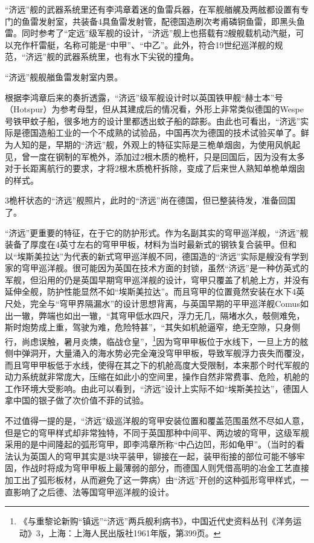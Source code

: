 \documentclass[12pt,UTF8]{ctexbook}
\begin{document}
“济远”舰的武器系统里还有李鸿章着迷的鱼雷兵器，在军舰艏艉及两舷都设置有专门的鱼雷发射室，共装备4具鱼雷发射管，配德国造刷次考甫磷铜鱼雷，即黑头鱼雷。同时参考了“定远”级军舰的设计，“济远”舰上也搭载有2艘舰载机动汽艇，可以充作杆雷艇，名称可能是“中甲”、“中乙”。此外，符合19世纪巡洋舰的规范，“济远”舰的武器系统里，也有水下尖锐的撞角。

“济远”舰舰艏鱼雷发射室内景。

根据李鸿章后来的奏折透露，“济远”级军舰设计时以英国铁甲舰“赫士本”号（Hotspur）为参考母型，但从其建成后的情况看，外形上非常类似德国的Wespe号铁甲蚊子船，很多地方的设计里都透出蚊子船的踪影。由此也可看出，“济远”实际是德国造船工业的一个不成熟的试验品，中国再次为德国的技术试验买单了。鲜为人知的是，早期的“济远”舰，外观上的特征实际是三桅单烟囱，为使用风帆起见，曾一度在钢制的军桅外，添加过2根木质的桅杆，只是回国后，因为没有太多对于长距离航行的要求，才将2根木质桅杆拆除，变成了后来世人熟知单桅单烟囱的样式。

3桅杆状态的“济远”舰照片，此时的“济远”尚在德国，但已整装待发，准备回国了。

“济远”更重要的特征，在于它的防护形式。作为名副其实的穹甲巡洋舰，“济远”舰装备了厚度在4英寸左右的穹甲甲板，材料为当时最新式的钢铁复合装甲。但和以“埃斯美拉达”为代表的新式穹甲巡洋舰不同，德国造的“济远”实际是艘没有学到家的穹甲巡洋舰。很可能因为英国在技术方面的封锁，虽然“济远”是一种仿英式的军舰，但沿用的仍是英国早期穹甲巡洋舰的设计，穹甲只覆盖了机舱上方，并没有延伸全舰，防护性能显然不如“埃斯美拉达”。而且穹甲的位置竟然安装在水下4英尺处，完全与“穹甲界隔漏水”的设计思想背离，与英国早期的平甲巡洋舰Comus如出一辙，弊端也如出一辙，“其穹甲低水四尺，浮力无几，隔堵水久，攲侧难免，斯时炮势成上重，驾驶为难，危险特甚”，“其失如机舱逼窄，绝无空隙，只身侧行，尚虑误触，暑月炎燠，临战仓皇”，\footnote{《与重黎论新购“镇远”“济远”两兵舰利病书》，中国近代史资料丛刊《洋务运动》3，上海：上海人民出版社1961年版，第399页。}因为穹甲甲板位于水线下，一旦上方的舷侧中弹洞开，大量涌入的海水势必完全淹没穹甲甲板，导致军舰浮力丧失而覆没，而且穹甲甲板低于水线，使得在其之下的机舱高度大受限制，本来那个时代军舰的动力系统就非常庞大，压缩在如此小的空间里，操作自然非常费事、危险，机舱的工作环境大受影响。由此可以看到，“济远”设计上实际不如“埃斯美拉达”，德国人拿中国的银子做了次价值不菲的试验。

不过值得一提的是，“济远”级巡洋舰的穹甲安装位置和覆盖范围虽然不尽如人意，但是它的穹甲样式却非常独特，不同于英国那种中间平、两边坡的穹甲，这级军舰采用的是中间隆起的弧形穹甲，即李鸿章所称“中凸边凹，形如龟甲”。（当时的看法认为英国人的穹甲其实是3块平装甲，铆接在一起，装甲衔接的部位可能不够牢固，作战时将成为穹甲甲板上最薄弱的部分，而德国人则凭借高明的冶金工艺直接加工出了弧形板材，从而避免了这一弊病）由“济远”开创的这种弧形穹甲样式，一直影响了之后德、法等国穹甲巡洋舰的设计。
\end{document}
